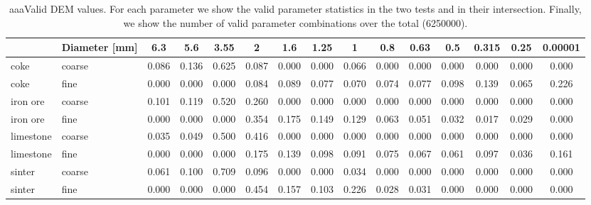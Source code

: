 \begin{sidewaystable}%
\centering
\begin{tabular}{l|rccccccccccccc}
\hline
          & \multicolumn{1}{c}{Diameter [mm]} & 6.3   & 5.6   & 3.55  & 2     & 1.6   & 1.25  & 1     & 0.8   & 0.63  & 0.5   & 0.315 & 0.25  & 0.00001 \\
\hline
    coke  & \multicolumn{1}{l}{coarse} & 0.086 & 0.136 & 0.625 & 0.087 & 0.000 & 0.000 & 0.066 & 0.000 & 0.000 & 0.000 & 0.000 & 0.000 & 0.000 \\
    coke  & \multicolumn{1}{l}{fine} & 0.000 & 0.000 & 0.000 & 0.084 & 0.089 & 0.077 & 0.070 & 0.074 & 0.077 & 0.098 & 0.139 & 0.065 & 0.226 \\
    iron ore & \multicolumn{1}{l}{coarse} & 0.101 & 0.119 & 0.520 & 0.260 & 0.000 & 0.000 & 0.000 & 0.000 & 0.000 & 0.000 & 0.000 & 0.000 & 0.000 \\
    iron ore & \multicolumn{1}{l}{fine} & 0.000 & 0.000 & 0.000 & 0.354 & 0.175 & 0.149 & 0.129 & 0.063 & 0.051 & 0.032 & 0.017 & 0.029 & 0.000 \\
    limestone & \multicolumn{1}{l}{coarse} & 0.035 & 0.049 & 0.500 & 0.416 & 0.000 & 0.000 & 0.000 & 0.000 & 0.000 & 0.000 & 0.000 & 0.000 & 0.000 \\
    limestone & \multicolumn{1}{l}{fine} & 0.000 & 0.000 & 0.000 & 0.175 & 0.139 & 0.098 & 0.091 & 0.075 & 0.067 & 0.061 & 0.097 & 0.036 & 0.161 \\
    sinter & \multicolumn{1}{l}{coarse} & 0.061 & 0.100 & 0.709 & 0.096 & 0.000 & 0.000 & 0.034 & 0.000 & 0.000 & 0.000 & 0.000 & 0.000 & 0.000 \\
    sinter & \multicolumn{1}{l}{fine} & 0.000 & 0.000 & 0.000 & 0.454 & 0.157 & 0.103 & 0.226 & 0.028 & 0.031 & 0.000 & 0.000 & 0.000 & 0.000 \\
    
\hline
\end{tabular}
\caption[aaaValid DEM values]{aaaValid DEM values. For each parameter we show
the valid parameter statistics in the two tests and in their intersection.
Finally, we show the number of valid parameter combinations over the total
(6250000).}
\label{tab:19particlesizedistributions}
\end{sidewaystable}